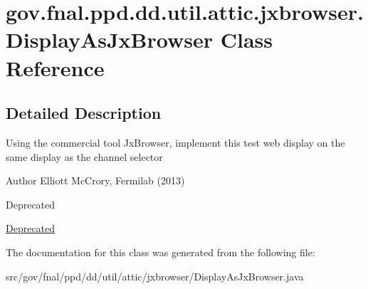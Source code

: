 \hypertarget{classgov_1_1fnal_1_1ppd_1_1dd_1_1util_1_1attic_1_1jxbrowser_1_1DisplayAsJxBrowser}{\section{gov.\-fnal.\-ppd.\-dd.\-util.\-attic.\-jxbrowser.\-Display\-As\-Jx\-Browser Class Reference}
\label{classgov_1_1fnal_1_1ppd_1_1dd_1_1util_1_1attic_1_1jxbrowser_1_1DisplayAsJxBrowser}
}


\subsection{Detailed Description}
Using the commercial tool Jx\-Browser, implement this test web display on the same display as the channel selector

\begin{DoxyAuthor}{Author}
Elliott Mc\-Crory, Fermilab (2013) 
\end{DoxyAuthor}
\begin{DoxyRefDesc}{Deprecated}
\item[\hyperlink{deprecated__deprecated000013}{Deprecated}]\end{DoxyRefDesc}


The documentation for this class was generated from the following file\-:\begin{DoxyCompactItemize}
\item 
src/gov/fnal/ppd/dd/util/attic/jxbrowser/Display\-As\-Jx\-Browser.\-java\end{DoxyCompactItemize}
